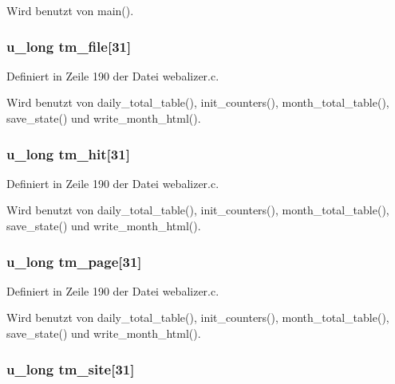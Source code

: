 Wird benutzt von main().
\subsubsection{\setlength{\rightskip}{0pt plus 5cm}u\_\-long {\bf tm\_\-file}[31]}\label{webalizer_8h_985c7f07bdd01aea04be87abba0d225b}




Definiert in Zeile 190 der Datei webalizer.c.

Wird benutzt von daily\_\-total\_\-table(), init\_\-counters(), month\_\-total\_\-table(), save\_\-state() und write\_\-month\_\-html().
\subsubsection{\setlength{\rightskip}{0pt plus 5cm}u\_\-long {\bf tm\_\-hit}[31]}\label{webalizer_8h_90b2c6f5c71d87e07a6aa0694651c7a8}




Definiert in Zeile 190 der Datei webalizer.c.

Wird benutzt von daily\_\-total\_\-table(), init\_\-counters(), month\_\-total\_\-table(), save\_\-state() und write\_\-month\_\-html().
\subsubsection{\setlength{\rightskip}{0pt plus 5cm}u\_\-long {\bf tm\_\-page}[31]}\label{webalizer_8h_2b0163914dcd84396a9d6dae48ee4a54}




Definiert in Zeile 190 der Datei webalizer.c.

Wird benutzt von daily\_\-total\_\-table(), init\_\-counters(), month\_\-total\_\-table(), save\_\-state() und write\_\-month\_\-html().
\subsubsection{\setlength{\rightskip}{0pt plus 5cm}u\_\-long {\bf tm\_\-site}[31]}\label{webalizer_8h_3016395581c35bac86027a654deb0db5}




